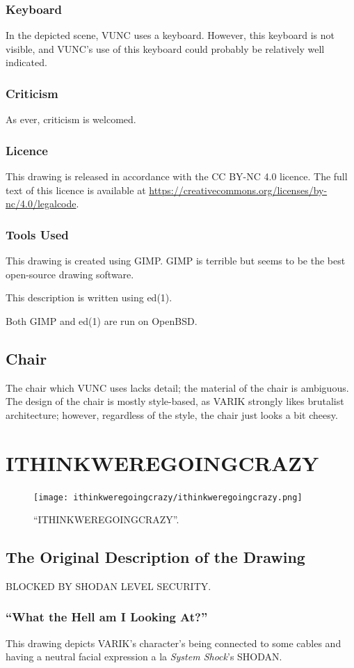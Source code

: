 \documentclass{report}
\begin{document}
\subsection{Keyboard}
In the depicted scene, VUNC uses a keyboard.  However, this keyboard is not visible, and VUNC's use of this keyboard could probably be relatively well indicated.
\subsection{Criticism}
As ever, criticism is welcomed.
\subsection{Licence}
This drawing is released in accordance with the CC BY-NC 4.0 licence.  The full text of this licence is available at \url{https://creativecommons.org/licenses/by-nc/4.0/legalcode}.
\subsection{Tools Used}
This drawing is created using GIMP\@.  GIMP is terrible but seems to be the best open-source drawing software.

This description is written using ed(1).

Both GIMP and ed(1) are run on OpenBSD\@.
\section{Chair}
The chair which VUNC uses lacks detail; the material of the chair is ambiguous.  The design of the chair is mostly style-based, as VARIK strongly likes brutalist architecture; however, regardless of the style, the chair just looks a bit cheesy.
\chapter{ITHINKWEREGOINGCRAZY}
\begin{figure}[ht]
	\centering
	\texttt{[image: ithinkweregoingcrazy/ithinkweregoingcrazy.png]}
	\caption[center]{``ITHINKWEREGOINGCRAZY''.}
\end{figure}
\section{The Original Description of the Drawing}
BLOCKED BY SHODAN LEVEL SECURITY\@.
\subsection{``What the Hell am I Looking At?''}
This drawing depicts VARIK's character's being connected to some cables and having a neutral facial expression a la \textit{System Shock}'s SHODAN\@.
\end{document}
